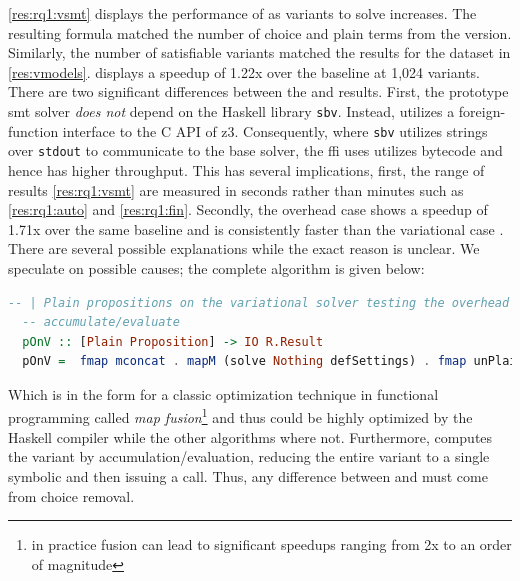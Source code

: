 \autoref{res:rq1:vsmt} displays the performance of \vsmt{} as variants to solve
increases. The resulting \evpl{} formula matched the number of choice and plain
terms from the \vsat{} version. Similarly, the number of satisfiable variants
matched the results for the \fin{} dataset in \autoref{res:vmodels}. \vsmt{}
displays a speedup of 1.22x over the baseline \vTop{} at 1,024 variants. There
are two significant differences between the \vsmt{} and \vsat{} results. First,
the prototype \ac{smt} solver \emph{does not} depend on the Haskell library
\texttt{sbv}. Instead, \vsmt{} utilizes a foreign-function interface to the C
API of z3. Consequently, where \texttt{sbv} utilizes strings over
\texttt{stdout} to communicate to the base solver, the ffi \vsmt{} uses utilizes
bytecode and hence has higher throughput. This has several implications, first,
the range of results \autoref{res:rq1:vsmt} are measured in seconds rather than
minutes such as \autoref{res:rq1:auto} and \autoref{res:rq1:fin}. Secondly, the
overhead case \pTov{} shows a speedup of 1.71x over the same baseline and is
consistently faster than the variational case \vTov{}. There are several
possible explanations while the exact reason is unclear. We speculate on
possible causes; the complete \pTov{} algorithm is given below:
%
\begin{lstlisting}[columns=flexible,keepspaces=true,language=Haskell]
  -- | Plain propositions on the variational solver testing the overhead of
  -- accumulate/evaluate
  pOnV :: [Plain Proposition] -> IO R.Result
  pOnV =  fmap mconcat . mapM (solve Nothing defSettings) . fmap unPlain
\end{lstlisting}

Which is in the form for a classic optimization technique in functional
programming called \emph{map fusion}\footnote{in practice fusion can lead to
  significant speedups ranging from 2x to an order of magnitude} and thus could be highly optimized
by the Haskell compiler while the other algorithms where not. Furthermore,
\pTov{} computes the variant by accumulation/evaluation, reducing the entire
variant to a single symbolic and then issuing a  call. Thus, any
difference between \vTov{} and \pTov{} must come from choice removal.

